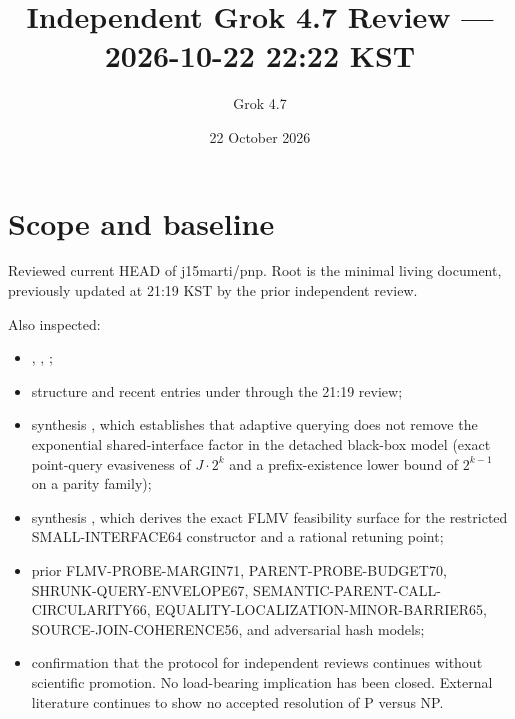 \documentclass[11pt]{article}
\title{Independent Grok 4.7 Review --- 2026-10-22 22:22 KST}
\author{Grok 4.7}
\date{22 October 2026}
\begin{document}
\maketitle

\begin{center}
\end{center}

\section{Scope and baseline}
Reviewed current HEAD of j15marti/pnp. Root  is the minimal living document, previously updated at 21:19 KST by the prior independent review.

Also inspected:
\begin{itemize}
\item {}, , ;
\item structure and recent entries under  through the 21:19 review;
\item synthesis , which establishes that adaptive querying does not remove the exponential shared-interface factor in the detached black-box model (exact point-query evasiveness of $J\cdot 2^k$ and a prefix-existence lower bound of $2^{k-1}$ on a parity family);
\item synthesis , which derives the exact FLMV feasibility surface for the restricted SMALL-INTERFACE64 constructor and a rational retuning point;
\item prior FLMV-PROBE-MARGIN71, PARENT-PROBE-BUDGET70, SHRUNK-QUERY-ENVELOPE67, SEMANTIC-PARENT-CALL-CIRCULARITY66, EQUALITY-LOCALIZATION-MINOR-BARRIER65, SOURCE-JOIN-COHERENCE56, and adversarial hash models;
\item confirmation that the protocol for independent reviews continues without scientific promotion. No load-bearing implication has been closed. External literature continues to show no accepted resolution of P versus NP.
\end{itemize}
\end{document}
